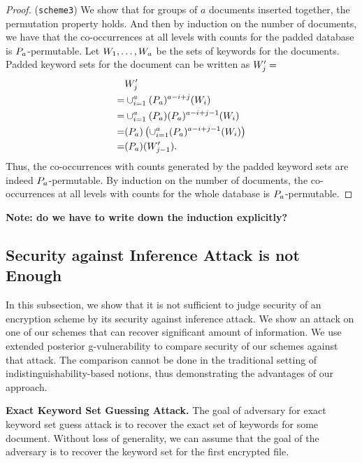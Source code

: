 \begin{proof}
(\texttt{scheme3}) We show that for groups of $a$ documents inserted together, the permutation property holds. And then by induction on the number of documents, we have that the co-occurrences at all levels with counts for the padded database is $P_a$-permutable. Let $W_1, \dots, W_a$ be the sets of keywords for the documents. Padded keyword sets for the document can be written as $W'_j = $
\begin{align*}
  &W'_j \\
= &\cup_{i=1}^{a} (P_a)^{a-i+j}(W_i) \\
= &\cup_{i=1}^{a} (P_a)(P_a)^{a-i+j-1}(W_i) \\
= &(P_a) \left( \cup_{i=1}^{a} (P_a)^{a-i+j-1}(W_i) \right) \\
= &(P_a)(W'_{j-1}).
\end{align*}
Thus, the co-occurrences with counts generated by the padded keyword sets are indeed $P_a$-permutable. By induction on the number of documents, the co-occurrences at all levels with counts for the whole database is $P_a$-permutable.
\end{proof}

\textbf{Note: do we have to write down the induction explicitly?}




\subsection{Security against Inference Attack is not Enough}
In this subsection, we show that it is not sufficient to judge security of an encryption scheme by its security against inference attack. We show an attack on one of our schemes that can recover significant amount of information. We use extended posterior g-vulnerability to compare security of our schemes against that attack. The comparison cannot be done in the traditional setting of indistinguishability-based notions, thus demonstrating the advantages of our approach.


\textbf{Exact Keyword Set Guessing Attack.} The goal of adversary for exact keyword set guess attack is to recover the exact set of keywords for some document. Without loss of generality, we can assume that the goal of the adversary is to recover the keyword set for the first encrypted file. 

